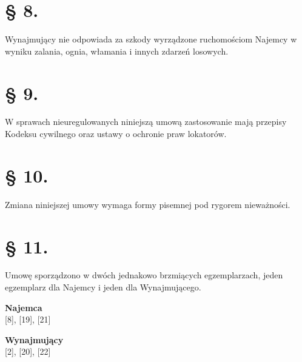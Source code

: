 \documentclass[a4paper,11pt, notitlepage]{article}
\begin{document}
   
\section*{§ 8.}
Wynajmujący nie odpowiada za szkody wyrządzone ruchomościom Najemcy w wyniku zalania, ognia, włamania i innych zdarzeń losowych.
\section*{§ 9.}
W sprawach nieuregulowanych niniejszą umową zastosowanie mają przepisy Kodeksu cywilnego oraz ustawy o ochronie praw lokatorów.
\section*{§ 10.}
Zmiana niniejszej umowy wymaga formy pisemnej pod rygorem nieważności.
\section*{§ 11.}
Umowę sporządzono w dwóch jednakowo brzmiących egzemplarzach, jeden egzemplarz dla Najemcy i jeden dla Wynajmującego.

\newline
\vspace{40pt}
\Large{\textbf{Najemca}} \\

[8], [19], [21]

\newline
\vspace{60pt}
\Large{\textbf{Wynajmujący}}\\

[2], [20], [22]
\end{document}
